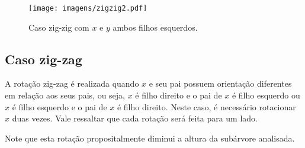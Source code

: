 {\begin{figure}[H]
\begin{comment}
        \draw[->] ([yshift=-0.5*\ht\strutbox,xshift=0.5cm]scope1.east) -- node [n] {} ([yshift=-0.5*\ht\strutbox,xshift=-0.5cm]scope2.west); %
        
        \draw[->] ([yshift=-2.20cm, xshift=-0.98cm]scope1.north) arc (198:-18:0.7cm);
        \draw[->,red] ([yshift=-3.67cm, xshift=-1.89cm]scope1.north) arc (198:-18:0.7cm);
    
    \end{tikzpicture}
    \end{comment}
    \texttt{[image: imagens/zigzig2.pdf]}
    \label{fig:zigzig}
\caption{Caso zig-zig com $x$ e $y$ ambos filhos esquerdos.}
\end{figure}


\subsection{Caso zig-zag}

A rotação zig-zag é realizada quando $x$ e seu pai possuem orientação diferentes em relação aos seus pais, ou seja, $x$ é filho direito e o pai de $x$ é filho esquerdo ou $x$ é filho esquerdo e o pai de $x$ é filho direito. Neste caso, é necessário rotacionar $x$ duas vezes. Vale ressaltar que cada rotação será feita para um lado.

Note que esta rotação propositalmente diminui a altura da subárvore analisada.
    
\begin{figure}[H]
    \centering
    \begin{comment}
    \begin{tikzpicture}[
        ed/.style = {densely dashed, shorten >= 5pt},
        alpha/.style = {regular polygon, regular polygon sides=3, draw, minimum size=1.1cm, inner sep=2pt, anchor=south},
        level distance=1.5cm,
        sibling distance=0.25cm
        ]

        \begin{scope}[local bounding box=scope1]
            \Tree [.$z$  [.$y$ \node[alpha]{a}; [.$x$ \node[alpha]{b}; \node[alpha]{c}; ]] \node[alpha]{d};]
        \end{scope}
        
        \begin{scope}[xshift=6cm, local bounding box=scope2]
            \Tree [.$z$  [.$x$ [.$y$ \node[alpha]{a}; \node[alpha]{b}; ] \node[alpha]{c};] \node[alpha]{d};]
            \end{scope}
            

\end{comment}
\end{figure}}
